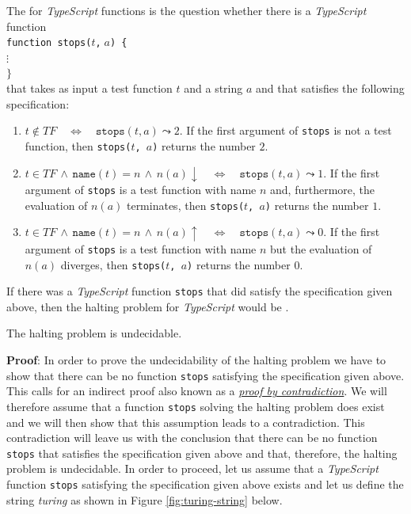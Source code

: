 \noindent
The   for \textsl{TypeScript} functions is the question whether there is a
\textsl{TypeScript} function \\[0.2cm]
\hspace*{1.3cm} \texttt{function stops($t$,$\;a$) \{ } \\
\hspace*{2.3cm} $\vdots$ \\
\hspace*{1.3cm} $\}$
\\[0.2cm] 
that takes as input a test function $t$ and a string $a$ and that satisfies the following specification:
\begin{enumerate}
\item $t \not\in T\!F \quad\Leftrightarrow\quad \mathtt{stops}(t, a) \leadsto 2$.
If the first argument of \texttt{stops} is not a test function, then 
      \texttt{stops($t$, $a$)} returns the number $2$.
\item $t \in T\!F \,\wedge\, \mathtt{name}(t) = n \,\wedge\, n(a)\downarrow \quad\Leftrightarrow\quad
       \mathtt{stops}(t, a) \leadsto 1$.
If the first argument of \texttt{stops} is a test function with name $n$ and, furthermore,
      the evaluation of $n(a)$ terminates, then \texttt{stops($t$, $a$)} returns the number $1$.
\item $t \in T\!F \,\wedge\, \mathtt{name}(t) = n \,\wedge\, n(a)\uparrow \quad\Leftrightarrow\quad
       \mathtt{stops}(t, a) \leadsto 0$.
If the first argument of \texttt{stops} is a test function with name $n$ but the evaluation of $n(a)$ 
      diverges, then 
      \texttt{stops($t$, $a$)} returns the number $0$.
\end{enumerate}
If there was a \textsl{TypeScript} function \texttt{stops} that did satisfy the specification given above,
then the halting problem for \textsl{TypeScript} would be .

\begin{Theorem}
  The halting problem is undecidable.
\end{Theorem}

\noindent
\textbf{Proof}:  In order to prove the undecidability of the halting problem we have to show that
there can be no function \texttt{stops} satisfying the specification given above.
This calls for an
indirect proof also known as a \href{http://en.wikipedia.org/wiki/Indirect_proof}{\emph{proof by contradiction}}.
We will therefore assume that a function \texttt{stops} solving the halting problem does
exist and we will then show that this assumption leads to a contradiction.
This contradiction will
leave us with the conclusion that there can be no function \texttt{stops} that satisfies
the specification given above and that, therefore, the halting problem is undecidable.
In order to proceed, let us assume that a \textsl{TypeScript} function \texttt{stops}
satisfying the specification given above exists and let us define the string
\textsl{turing} as shown in Figure \ref{fig:turing-string} below.

